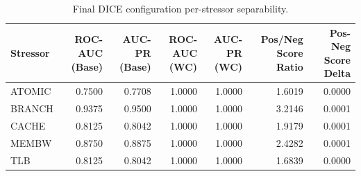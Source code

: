 \begin{table}[t]
\centering
\caption{Final DICE configuration per-stressor separability.}
\label{tab:dice_full_stressor}
\footnotesize
\begin{tabular}{lrrrrrr}
\toprule
Stressor & ROC-AUC (Base) & AUC-PR (Base) & ROC-AUC (WC) & AUC-PR (WC) & Pos/Neg Score Ratio & Pos-Neg Score Delta \\
\midrule
ATOMIC & 0.7500 & 0.7708 & 1.0000 & 1.0000 & 1.6019 & 0.0000 \\
BRANCH & 0.9375 & 0.9500 & 1.0000 & 1.0000 & 3.2146 & 0.0001 \\
CACHE & 0.8125 & 0.8042 & 1.0000 & 1.0000 & 1.9179 & 0.0001 \\
MEMBW & 0.8750 & 0.8875 & 1.0000 & 1.0000 & 2.4282 & 0.0001 \\
TLB & 0.8125 & 0.8042 & 1.0000 & 1.0000 & 1.6839 & 0.0000 \\
\bottomrule
\end{tabular}

\end{table}
